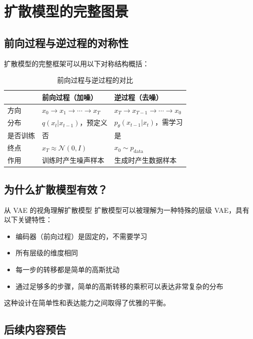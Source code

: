 \section{扩散模型的完整图景}

\subsection{前向过程与逆过程的对称性}

扩散模型的完整框架可以用以下对称结构概括：

\begin{table}[H]
\centering
\begin{tabular}{lll}
\toprule
 & \textbf{前向过程（加噪）} & \textbf{逆过程（去噪）} \\
\midrule
方向 & $x_0 \to x_1 \to \cdots \to x_T$ & $x_T \to x_{T-1} \to \cdots \to x_0$ \\
分布 & $q(x_t | x_{t-1})$，预定义 & $p_\theta(x_{t-1} | x_t)$，需学习 \\
是否训练 & 否 & 是 \\
终点 & $x_T \approx \mathcal{N}(0, I)$ & $x_0 \sim p_{\text{data}}$ \\
作用 & 训练时产生噪声样本 & 生成时产生数据样本 \\
\bottomrule
\end{tabular}
\caption{前向过程与逆过程的对比}
\end{table}

\subsection{为什么扩散模型有效？}

\begin{knowledgebox}{从 VAE 的视角理解扩散模型}
扩散模型可以被理解为一种特殊的层级 VAE，具有以下关键特性：
\begin{itemize}
    \item 编码器（前向过程）是固定的，不需要学习
    \item 所有层级的维度相同
    \item 每一步的转移都是简单的高斯扰动
    \item 通过足够多的步骤，简单的高斯转移的乘积可以表达非常复杂的分布
\end{itemize}
这种设计在简单性和表达能力之间取得了优雅的平衡。
\end{knowledgebox}

\subsection{后续内容预告}

